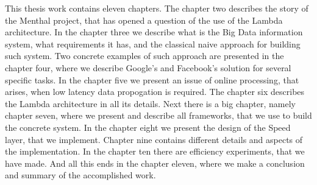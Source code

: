 This thesis work contains eleven chapters.
The chapter two describes the story of the Menthal project, that has opened a question of the use of the Lambda architecture.
In the chapter three we describe what is the Big Data information system, what requirements it has, and the classical naive approach for building such system. 
Two concrete examples of such approach are presented in the chapter four, where we describe Google's and Facebook's solution for several specific tasks.
In the chapter five we present an issue of online processing, that arises, when low latency data propogation is required.
The chapter six describes the Lambda architecture in all its details.
Next there is a big chapter, namely chapter seven, where we present and describe all frameworks, that we use to build the concrete system.
In the chapter eight we present the design of the Speed layer, that we implement.
Chapter nine contains different details and aspects of the implementation.
In the chapter ten there are efficiency experiments, that we have made.
And all this ends in the chapter eleven, where we make a conclusion and summary of the accomplished work.